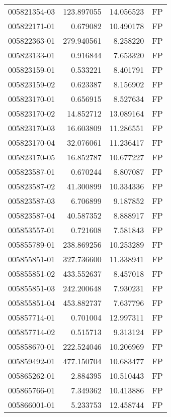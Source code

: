 \begin{tabular}{lrrl}
005821354-03 &  123.897055 &      14.056523 &   FP \\
005822171-01 &    0.679082 &      10.490178 &   FP \\
005822363-01 &  279.940561 &       8.258220 &   FP \\
005823133-01 &    0.916844 &       7.653320 &   FP \\
005823159-01 &    0.533221 &       8.401791 &   FP \\
005823159-02 &    0.623387 &       8.156902 &   FP \\
005823170-01 &    0.656915 &       8.527634 &   FP \\
005823170-02 &   14.852712 &      13.089164 &   FP \\
005823170-03 &   16.603809 &      11.286551 &   FP \\
005823170-04 &   32.076061 &      11.236417 &   FP \\
005823170-05 &   16.852787 &      10.677227 &   FP \\
005823587-01 &    0.670244 &       8.807087 &   FP \\
005823587-02 &   41.300899 &      10.334336 &   FP \\
005823587-03 &    6.706899 &       9.187852 &   FP \\
005823587-04 &   40.587352 &       8.888917 &   FP \\
005853557-01 &    0.721608 &       7.581843 &   FP \\
005855789-01 &  238.869256 &      10.253289 &   FP \\
005855851-01 &  327.736600 &      11.338941 &   FP \\
005855851-02 &  433.552637 &       8.457018 &   FP \\
005855851-03 &  242.200648 &       7.930231 &   FP \\
005855851-04 &  453.882737 &       7.637796 &   FP \\
005857714-01 &    0.701004 &      12.997311 &   FP \\
005857714-02 &    0.515713 &       9.313124 &   FP \\
005858670-01 &  222.524046 &      10.206969 &   FP \\
005859492-01 &  477.150704 &      10.683477 &   FP \\
005865262-01 &    2.884395 &      10.510443 &   FP \\
005865766-01 &    7.349362 &      10.413886 &   FP \\
005866001-01 &    5.233753 &      12.458744 &   FP \\

\end{tabular}

